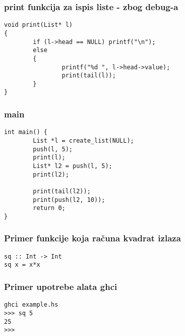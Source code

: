 \documentclass{beamer}
\begin{document}
\begin{frame}[fragile]
\frametitle{print funkcija za ispis liste - zbog debug-a}
\begin{lstlisting}
void print(List* l)
{
        if (l->head == NULL) printf("\n");
        else
        {
                printf("%d ", l->head->value);
                print(tail(l));
        }
}
\end{lstlisting}
\end{frame}

\begin{frame}[fragile]
\frametitle{main}
\begin{lstlisting}
int main() {
        List *l = create_list(NULL);
        push(l, 5);
        print(l);
        List* l2 = push(l, 5);
        print(l2);

        print(tail(l2));
        print(push(l2, 10));
        return 0;
}
\end{lstlisting}
\end{frame}


\begin{frame}[fragile]
\frametitle{Primer funkcije koja računa kvadrat izlaza}
\begin{lstlisting}
sq :: Int -> Int
sq x = x*x
\end{lstlisting}
\end{frame}


\begin{frame}[fragile]
\frametitle{Primer upotrebe alata ghci}
\begin{lstlisting}
ghci example.hs 
>>> sq 5 
25
>>>
\end{lstlisting}
\end{frame}
\end{document}
